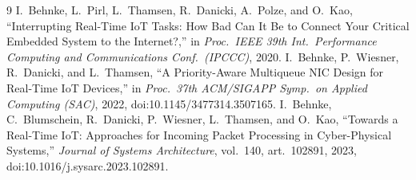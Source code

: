 \begin{thebibliography}{9}
 I.\ Behnke, L.\ Pirl, L.\ Thamsen, R.\ Danicki, A.\ Polze, and O.\ Kao,
``Interrupting Real-Time IoT Tasks: How Bad Can It Be to Connect Your Critical Embedded System
to the Internet?,'' in \emph{Proc.\ IEEE 39th Int.\ Performance Computing and Communications
Conf.\ (IPCCC)}, 2020.
 I.\ Behnke, P.\ Wiesner, R.\ Danicki, and L.\ Thamsen, ``A Priority-Aware
Multiqueue NIC Design for Real-Time IoT Devices,'' in \emph{Proc.\ 37th ACM/SIGAPP Symp.\ on
Applied Computing (SAC)}, 2022, doi:10.1145/3477314.3507165.
 I.\ Behnke, C.\ Blumschein, R.\ Danicki, P.\ Wiesner, L.\ Thamsen, and
O.\ Kao, ``Towards a Real-Time IoT: Approaches for Incoming Packet Processing in Cyber-Physical
Systems,'' \emph{Journal of Systems Architecture}, vol.\ 140, art.\ 102891, 2023,
doi:10.1016/j.sysarc.2023.102891.
\end{thebibliography}


